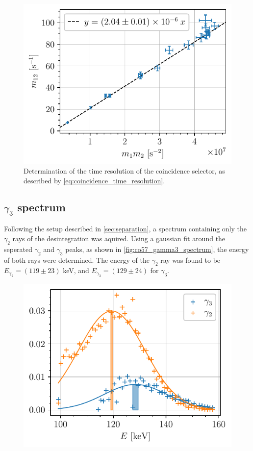 \begin{figure}[htbp]
    \centering
    \includegraphics[scale=1]{figures/twotheta_cs137.pdf}
    \caption{Determination of the time resolution of the coincidence
    selector, as described by \autoref{eq:coincidence_time_resolution}.}
    \label{fig:twotheta_cs137}
\end{figure}


\subsection{$\gamma_3$ spectrum}

Following the setup described in \autoref{sec:separation}, a spectrum containing only the \(\gamma_2\) rays of the \cobalt desintegration was aquired. Using a gaussian fit around the seperated \(\gamma_2\) and \(\gamma_3\) peaks, as shown in \autoref{fig:co57_gamma3_spectrum}, the energy of both rays were determined. The energy of the \(\gamma_2\) ray was found to be \(E_{\gamma_2} = (119 \pm 23)\) keV, and \(E_{\gamma_3} = (129 \pm 24)\) for \(\gamma_3\).

\begin{figure}[htbp]
    \centering
    \includegraphics[scale=1]{figures/co57_gamma2_gamma3.pdf}
    \caption{}
    \label{fig:co57_gamma3_spectrum}
\end{figure}

